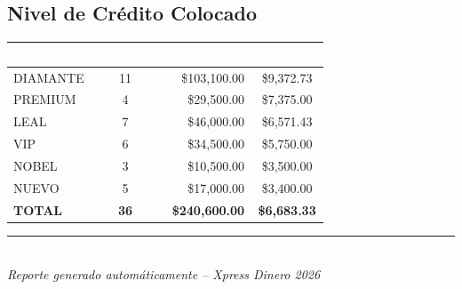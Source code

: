 \documentclass[11pt,a4paper]{article}
\begin{document}
\subsection*{Nivel de Cr\'edito Colocado}

\begin{center}
\renewcommand{\arraystretch}{1.3}
\begin{tabular}{|l|c|r|c|}
\hline
\rowcolor{headerblue}
\textcolor{white}{\textbf{Nivel}} &
\textcolor{white}{\textbf{Cantidad}} &
\textcolor{white}{\textbf{Monto Total}} &
\textcolor{white}{\textbf{Promedio}} \\
\hline
DIAMANTE & 11 & \$103,100.00 & \$9,372.73 \\
\hline
\rowcolor{lightgray}
PREMIUM & 4 & \$29,500.00 & \$7,375.00 \\
\hline
LEAL & 7 & \$46,000.00 & \$6,571.43 \\
\hline
\rowcolor{lightgray}
VIP & 6 & \$34,500.00 & \$5,750.00 \\
\hline
NOBEL & 3 & \$10,500.00 & \$3,500.00 \\
\hline
\rowcolor{lightgray}
NUEVO & 5 & \$17,000.00 & \$3,400.00 \\
\hline
\hline
\textbf{TOTAL} & \textbf{36} & \textbf{\$240,600.00} & \textbf{\$6,683.33} \\
\hline
\end{tabular}
\end{center}

\vspace{1cm}

\begin{center}
\rule{0.6\textwidth}{0.3pt}\\[0.3cm]
\textit{Reporte generado autom\'aticamente -- Xpress Dinero 2026}
\end{center}
\end{document}

